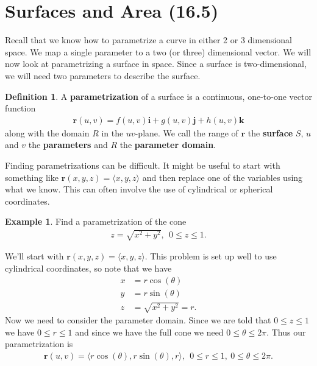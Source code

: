 \documentclass[12pt, letter]{article}
\theoremstyle{plain}
\numberwithin{theorem}{section}
\theoremstyle{definition}
\newtheorem{definition}[theorem]{Definition}
\newtheorem{example}[theorem]{Example}
\begin{document}
\newpage


\section{Surfaces and Area (16.5)}

Recall that we know how to parametrize a curve in either 2 or 3 dimensional space. We map a single parameter to a two (or three) dimensional vector. We will now look at parametrizing a surface in space. Since a surface is two-dimensional, we will need two parameters to describe the surface.

\bigskip

\begin{definition}
A \textbf{parametrization} of a surface is a continuous, one-to-one vector function
\begin{align*}
\bm{r}(u,v) = f(u,v)\bm{i}+g(u,v)\bm{j}+h(u,v)\bm{k}
\end{align*}
along with the domain $R$ in the $uv$-plane. We call the range of $\bm{r}$ the \textbf{surface} $S$, $u$ and $v$ the \textbf{parameters} and $R$ the \textbf{parameter domain}.
\end{definition}

\bigskip

\hrulefill

\bigskip

Finding parametrizations can be difficult. It might be useful to start with something like $\bm{r}(x,y,z) = \langle x,y,z\rangle$ and then replace one of the variables using what we know. This can often involve the use of cylindrical or spherical coordinates.

\bigskip

\hrulefill

\bigskip

\begin{example}
Find a parametrization of the cone
\begin{align*}
z=\sqrt{x^2+y^2}, \ \ 0\leq z \leq 1.
\end{align*}

\bigskip

We'll start with $\bm{r}(x,y,z) = \langle x,y,z\rangle$. This problem is set up well to use cylindrical coordinates, so note that we have
\begin{align*}
x&=r\cos(\theta)\\
y&=r\sin(\theta)\\
z&=\sqrt{x^2+y^2}=r.
\end{align*}
Now we need to consider the parameter domain. Since we are told that $0\leq z \leq 1$ we have $0\leq r \leq 1$ and since we have the full cone we need $0\leq \theta \leq 2\pi$. Thus our parametrization is
\begin{align*}
\bm{r}(u,v) = \langle r\cos(\theta),r\sin(\theta), r\rangle, \ \ 0\leq r \leq 1, \ 0\leq \theta \leq 2\pi.
\end{align*}
\end{example}
\end{document}
